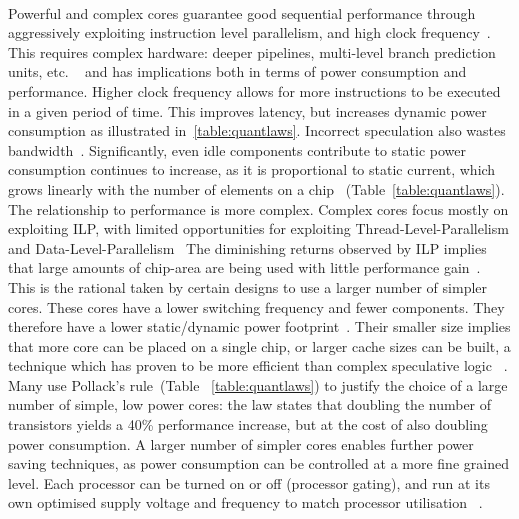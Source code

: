 \paragraph{} Powerful and complex cores guarantee good sequential performance
through aggressively exploiting instruction level parallelism,
and high clock frequency~\cite{4563876}. This requires complex hardware:
deeper pipelines, multi-level branch prediction units, etc. ~\cite{hennessy2006comparchquantitative,Vajda:1414193} and has implications both in terms of power consumption
and performance. Higher clock frequency allows for more 
instructions to be executed in a given period of time. This
improves latency, but increases dynamic power consumption as illustrated
in~\ref{table:quantlaws}. Incorrect speculation also wastes bandwidth~\cite{rogers2009bandwidth}. 
Significantly, even idle components contribute to static power consumption continues to increase, as it is proportional
to static current, which grows linearly with the number of elements
on a chip~\cite{hennessy2006comparchquantitative} (Table~\ref{table:quantlaws}). The relationship to performance is more complex. Complex cores
focus mostly on exploiting ILP, with limited opportunities
for exploiting Thread-Level-Parallelism and Data-Level-Parallelism~\cite{borkar2011future} The diminishing returns observed by ILP implies that large amounts
of chip-area are being used with little performance gain~\cite{Borkar:2007:TCC:1278480.1278667}. This is 
the rational taken by certain designs to use a larger number
of simpler cores. These cores have a lower switching frequency
and fewer components. They therefore have a lower static/dynamic power
footprint~\cite{Borkar:2007:TCC:1278480.1278667}. Their smaller size implies that more core can be placed on 
a single chip, or larger cache sizes can be built, a technique
which has proven to be more efficient than complex speculative logic
~\cite{borkar2011future}.  Many use Pollack's rule~\cite{borkar2011future}(Table ~\ref{table:quantlaws})
to justify the choice of a large number of simple, low power cores: the 
law states that doubling the number of transistors yields
a 40\% performance increase, but at the cost of also doubling power consumption.
A larger number of simpler cores enables further power saving techniques, as power consumption can be controlled at a more fine grained level. 
Each processor can be turned on or off (processor gating), and run at its own
optimised supply voltage and frequency to match processor utilisation ~\cite{Borkar:2007:TCC:1278480.1278667}. 

